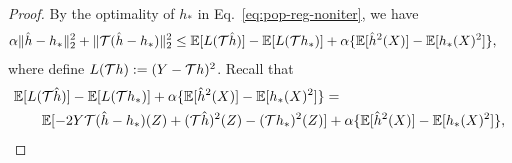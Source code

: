 \begin{proof}
By the optimality of $h_*$ in Eq.~\eqref{eq:pop-reg-noniter}, we have 
\begin{align*}
    & \alpha \|\hat{h} - h_* \|^2_2 + \|{\mathcal{T}}(\hat{h}-h_*)\|^2_2  \leq \mathbb{E}[L({\mathcal{T}} \hat{h}) ] - \mathbb{E}[L ({\mathcal{T}} h_*)] + \alpha\{\mathbb{E}[\hat{h}^2(X)] - \mathbb{E}[h_*(X)^2]\},
\end{align*}
where define $L({\mathcal{T}} h):= (Y- {\mathcal{T}} h)^2$. 
Recall that \begin{align*}
    &\mathbb{E}[L({\mathcal{T}} \hat{h}) ] - \mathbb{E}[L ({\mathcal{T}} h_*)] + \alpha\{\mathbb{E}[\hat{h}^2(X)] - \mathbb{E}[h_*(X)^2]\} =\\
    &\qquad\mathbb{E}[ - 2 Y  {\mathcal{T}} (\hat{h}-h_*)(Z)  + ({\mathcal{T}} \hat{h})^2(Z) -  ({\mathcal{T}} h_*)^2(Z) ] +  \alpha\{\mathbb{E}[\hat{h}^2(X)] - \mathbb{E}[h_*(X)^2]\},
\end{align*}



\end{proof}
